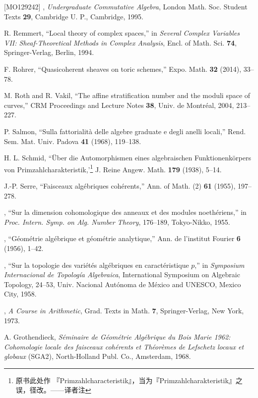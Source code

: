 \begin{thebibliography}{[MO129242]}
\sameauthor, \emph{Undergraduate Commutative Algebra}, London Math. Soc.
Student Texts \textbf{29}, Cambridge U. P., Cambridge, 1995.

R. Remmert, ``Local theory of complex spaces,'' in \emph{Several Complex
Variables VII: Sheaf-Theoretical Methods in Complex Analysis}, Encl. of Math.
Sci. \textbf{74}, Springer-Verlag, Berlin, 1994.

F. Rohrer, ``Quasicoherent sheaves on toric schemes,'' Expo. Math.
\textbf{32} (2014), 33--78.

M. Roth and R. Vakil, ``The affine stratification number and the moduli space
of curves,'' CRM Proceedings and Lecture Notes \textbf{38}, Univ. de
Montréal, 2004, 213--227.

P. Salmon, ``Sulla fattorialità delle algebre graduate e degli anelli
locali,'' Rend. Sem. Mat. Univ. Padova \textbf{41} (1968), 119--138.

H. L. Schmid, ``Über die Automorphismen eines algebraischen
Funktionenkörpers von Primzahlcharakteristik,'\footnote{原书此处作
『Primzahlcharacteristik』，当为『Primzahlcharakteristik』之误，径改。——译者注}
J. Reine Angew. Math. \textbf{179} (1938), 5--14.

J.-P. Serre, ``Faisceaux algébriques cohérents,'' Ann. of Math. (2)
\textbf{61} (1955), 197--278.

\sameauthor, ``Sur la dimension cohomologique des anneaux et des modules
noethériens,'' in \emph{Proc. Intern. Symp. on Alg. Number Theory}, 176--189,
Tokyo-Nikko, 1955.

\sameauthor, ``Géométrie algébrique et géométrie analytique,'' Ann. de
l'institut Fourier \textbf{6} (1956), 1--42.

\sameauthor, ``Sur la topologie des variétés algébriques en caractéristique
$p$,'' in \emph{Symposium Internacional de Topología Algebraica},
International Symposium on Algebraic Topology, 24--53, Univ. Nacional
Autónoma de México and UNESCO, Mexico City, 1958.

\sameauthor, \emph{A Course in Arithmetic}, Grad. Texts in Math. \textbf{7},
Springer-Verlag, New York, 1973.

A. Grothendieck, \emph{Séminaire de Géométrie Algébrique du Bois Marie 1962:
Cohomologie locale des faisceaux cohérents et Théorèmes de Lefschetz locaux et
globaux} (SGA2), North-Holland Publ. Co., Amsterdam, 1968.


\end{thebibliography}
